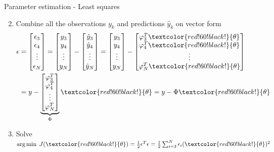 \documentclass[presentation,aspectratio=169]{beamer}
\begin{document}
\begin{frame}[label={sec:org0f4f9bf}]{Parameter estimation - Least squares}
\begin{enumerate}
\setcounter{enumi}{1}
\item Combine all the observations \(y_k\) and predictions \(\hat{y}_k\) on vector form
\begin{align*}
\epsilon &= \begin{bmatrix} \epsilon_3\\\epsilon_4\\\vdots\\\epsilon_N\end{bmatrix} =  \begin{bmatrix} y_3\\ y_4\\\vdots\\y_N \end{bmatrix} - \begin{bmatrix} \hat{y}_3\\ \hat{y}_4\\\vdots\\\hat{y}_N \end{bmatrix}
 =  \begin{bmatrix} y_3\\ y_4\\\vdots\\y_N \end{bmatrix} - \begin{bmatrix} \varphi_3^T\textcolor{red!60!black!}{\theta}\\ \varphi_4^T\textcolor{red!60!black!}{\theta}\\\vdots\\\varphi_N^T\textcolor{red!60!black!}{\theta} \end{bmatrix}\\
&= y - \underbrace{\begin{bmatrix}\varphi_3^T\\\varphi_4^T\\\vdots\\\varphi_N^T\end{bmatrix}}_{\Phi}\textcolor{red!60!black!}{\theta} = y - \Phi\textcolor{red!60!black!}{\theta} 
\end{align*}
\item Solve \(\arg\min \; J(\textcolor{red!60!black!}{\theta}) = \frac{1}{2}\epsilon^T\epsilon = \frac{1}{2}\sum_{i=3}^N \epsilon_i(\textcolor{red!60!black!}{\theta})^2\)
\end{enumerate}
\end{frame}
\end{document}

